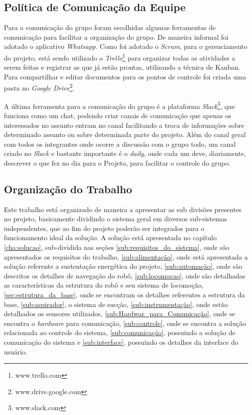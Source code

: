 \subsection{Política de Comunicação da Equipe} %
\label{sub:política_de_comunicação_da_equipe}
	
	Para a comunicação do grupo foram escolhidas algumas ferramentas de comunicação para facilitar a organização do grupo. De maneira informal foi adotado o aplicativo \textit{Whatsapp}. Como foi adotado o \textit{Scrum}, para o gerenciamento do projeto, está sendo utilizado o \textit{Trello}\footnote{www.trello.com} para organizar todas as atividades a serem feitas e registrar as que já estão prontas, utilizando a técnica de Kanban. Para compartilhar e editar documentos para os pontos de controle foi criada uma pasta no \textit{Google Drive}\footnote{www.drive.google.com}. 

	A última ferramenta para a comunicação do grupo é a plataforma \textit{Slack}\footnote{www.slack.com}, que funciona como um chat, podendo criar canais de comunicação que apenas os interessados no assunto entram no canal facilitando a troca de informações sobre determinado assunto ou sobre determinada parte do projeto. Além do canal geral com todos os integrantes onde ocorre a discussão com o grupo todo, um canal criado no \textit{Slack} e bastante importante é o \textit{daily}, onde cada um deve, diariamente, descrever o que fez no dia para o Projeto, para facilitar o controle do grupo. 

\subsection{Organização do Trabalho} %
\label{sub:organização_do_trabalho}
	
	Este trabalho está organizado de maneira a apresentar as sub divisões presentes no projeto, basicamente dividindo o sistema geral em diversos sub-sistemas independentes, que ao fim do projeto poderão ser integrados para o funcionamento ideal da solução. A solução está apresentada no capítulo \ref{cha:solucao}, sub-dividida nas seções \ref{sub:requisitos_do_sistema}, onde são apresentados os requisitos do trabalho, \ref{sub:alimentação}, onde está apresentada a solução referente a sustentação energética do projeto, \ref{sub:automação}, onde são descritos os detalhes de navegação do robô, \ref{sub:locomocao}, onde são detalhadas as características da estrutura do robô e seu sistema de locomoção, \ref{sec:estrutura_da_base}, onde se encontram os detalhes referentes a estrutura da base, \ref{sub:aspirador}, o sistema de sucção, \ref{sub:instrumentação}, onde estão detalhados os sensores utilizados, \ref{sub:Hardwar_para_Comunicação}, onde se encontra o \textit{hardware} para comunicação, \ref{sub:controle}, onde se encontra a solução relacionada ao controle do sistema, \ref{sub:comunicação}, possuindo a solução de comunicação do sistema e \ref{sub:interface}, possuindo os detalhes da interface do usuário.

